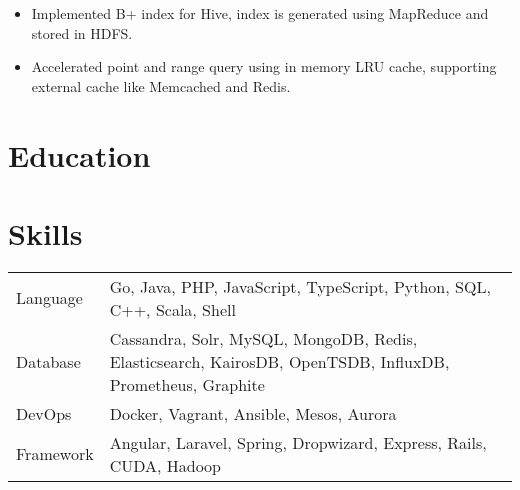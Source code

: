 \documentclass[11pt, letterpaper]{simple-cv}
\begin{document}

\begin{itemize}
  \item Implemented B+ index for Hive, index is generated using MapReduce and stored in HDFS.
  \item Accelerated point and range query using in memory LRU cache, supporting external cache like Memcached and Redis.
\end{itemize}


\section{Education}
{}

\section{Skills}
\begin{flushleft}
\begin{tabular}{@{}ll@{}}
 Language &  Go, Java, PHP, JavaScript, TypeScript, Python, SQL, C++, Scala, Shell\\
 Database & Cassandra, Solr, MySQL, MongoDB, Redis, Elasticsearch, KairosDB, OpenTSDB, InfluxDB, Prometheus, Graphite\\
 DevOps & Docker, Vagrant, Ansible, Mesos, Aurora\\
 Framework & Angular, Laravel, Spring, Dropwizard, Express, Rails, CUDA, Hadoop
\end{tabular}
\end{flushleft}
\end{document}
